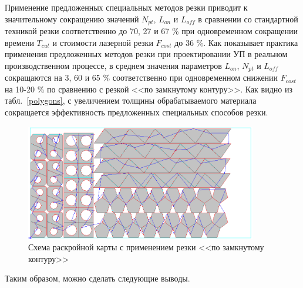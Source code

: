 \documentclass[11pt,twoside,openany]{report}
\begin{document}
Применение предложенных специальных методов резки
приводит к значительному сокращению значений
$N_{pt}$, $L_{on}$ и $L_{off}$
в сравнении со стандартной техникой резки
соответственно до 70, 27 и 67 \%
при одновременном сокращении времени
$T_{cut}$
и стоимости лазерной резки
$F_{cost}$ до 36 \%.
Как показывает практика применения
предложенных методов резки при проектировании
УП в реальном производственном процессе,
в среднем значения параметров
$L_{on}$, $N_{pt}$  и $L_{off}$
сокращаются на 3, 60 и 65 \%
соответственно при одновременном снижении
$F_{cost}$
на 10-20 \%
по сравнению с резкой <<по замкнутому контуру>>.
Как видно из табл.~\ref{polygons},
с увеличением толщины обрабатываемого материала
сокращается эффективность предложенных специальных способов резки.

\begin{figure}[h]
  \begin{center}
  \includegraphics[width=0.9\textwidth]{multi-b.png}
  \caption{Схема раскройной карты с применением резки <<по замкнутому контуру>>}
  \label{multi-b}
  \end{center}
\end{figure}

Таким образом, можно сделать следующие выводы.
\end{document}

